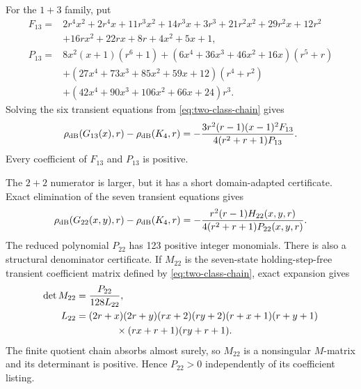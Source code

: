 For the $1+3$ family, put
\begin{align*}
 F_{13}={}&2r^4x^2+2r^4x+11r^3x^2+14r^3x+3r^3
 +21r^2x^2+29r^2x+12r^2\\
 &+16rx^2+22rx+8r+4x^2+5x+1,\\
 P_{13}={}&8x^2(x+1)(r^6+1)
 +(6x^4+36x^3+46x^2+16x)(r^5+r)\\
 &+(27x^4+73x^3+85x^2+59x+12)(r^4+r^2)\\
 &+(42x^4+90x^3+106x^2+66x+24)r^3.
\end{align*}
Solving the six transient equations from \eqref{eq:two-class-chain} gives
\begin{equation}
 \rho_{\mathrm{dB}}(G_{13}(x),r)-\rho_{\mathrm{dB}}(K_4,r)
 =-\frac{3r^2(r-1)(x-1)^2F_{13}}
 {4(r^2+r+1)P_{13}}.                         \label{eq:k4-13}
\end{equation}
Every coefficient of $F_{13}$ and $P_{13}$ is positive.

The $2+2$ numerator is larger, but it has a short domain-adapted
certificate.  Exact elimination of the seven transient equations gives
\begin{equation}
 \rho_{\mathrm{dB}}(G_{22}(x,y),r)-\rho_{\mathrm{dB}}(K_4,r)
 =-\frac{r^2(r-1)H_{22}(x,y,r)}
 {4(r^2+r+1)P_{22}(x,y,r)}.                  \label{eq:k4-22}
\end{equation}
The reduced polynomial $P_{22}$ has 123 positive integer monomials.  There is
also a structural denominator certificate.  If $M_{22}$ is the seven-state
holding-step-free transient coefficient matrix defined by
\eqref{eq:two-class-chain}, exact expansion gives
\begin{align}
 \det M_{22}&=\frac{P_{22}}{128L_{22}},\notag\\
 L_{22}&=(2r+x)(2r+y)(rx+2)(ry+2)(r+x+1)(r+y+1)\notag\\
 &\hspace{1.45cm}{}\times(rx+r+1)(ry+r+1).       \label{eq:k4-denominator}
\end{align}
The finite quotient chain absorbs almost surely, so $M_{22}$ is a nonsingular
$M$-matrix and its determinant is positive.  Hence $P_{22}>0$ independently
of its coefficient listing.

